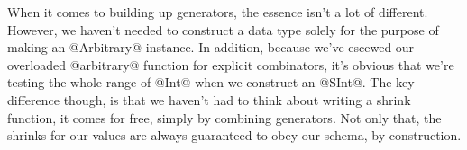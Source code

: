 When it comes to building up generators, the essence isn't a lot of different. However, we haven't needed to construct a data type solely for the purpose of making an @Arbitrary@ instance. In addition, because we've escewed our overloaded @arbitrary@ function for explicit combinators, it's obvious that we're testing the whole range of @Int@ when we construct an @SInt@. The key difference though, is that we haven't had to think about writing a shrink function, it comes for free, simply by combining generators. Not only that, the shrinks for our values are always guaranteed to obey our schema, by construction.
